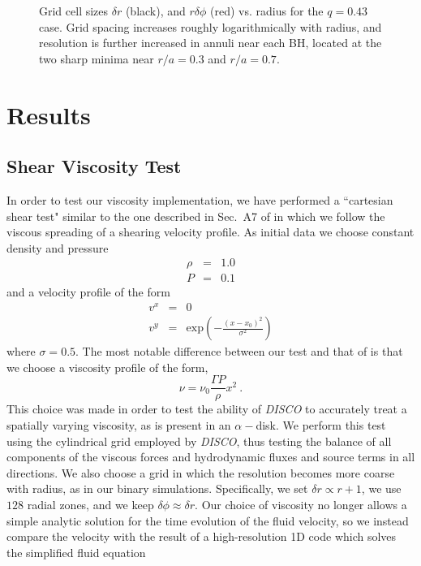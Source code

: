 \documentclass[apj]{emulateapj}
\begin{document}
\begin{figure}
\caption{Grid cell sizes $\delta r$ (black), and $r \delta \phi$ (red) vs. radius for the $q=0.43$ case. Grid spacing increases roughly logarithmically with radius, and resolution is further increased in annuli near each BH, located at the two sharp minima near $r/a=0.3$ and $r/a=0.7$. }
\label{fig:grid_info}
\end{figure}

\section{Results}
\label{sec:results}
    \subsection{Shear Viscosity Test}
    In order to test our viscosity implementation, we have performed a ``cartesian shear test" similar to the one described in Sec.~A7 of \citet{dorazio13} in which we follow the viscous spreading of a shearing velocity profile. As initial data we choose constant density and pressure
    \begin{eqnarray}
    \rho &=& 1.0\\
    P &=& 0.1
    \end{eqnarray}
    and a velocity profile of the form
    \begin{eqnarray}
    v^x &=& 0\\
          v^y &=& \mbox{exp}\left(-\frac{(x-x_0)^2}{\sigma^2}\right)
          \end{eqnarray}
          where $\sigma=0.5$. The most notable difference between our test and that of \citet{dorazio13} is that we choose a viscosity profile of the form,
          \begin{equation}
          \nu = \nu_0 \frac{\Gamma P}{\rho} x^{2} \ .
          \end{equation}
          This choice was made in order to test the ability of {\it DISCO} to accurately treat a spatially varying viscosity, as is present in an $\alpha-$disk. We perform this test using the cylindrical grid employed by {\it DISCO}, thus testing the balance of all components of the viscous forces and hydrodynamic fluxes and source terms in all directions. We also choose a grid in which the resolution becomes more coarse with radius, as in our binary simulations. Specifically, we set $\delta r \propto r+1$, we use $128$ radial zones, and we keep $\delta \phi \approx \delta r$. Our choice of viscosity no longer allows a simple analytic solution for the time evolution of the fluid velocity, so we instead compare the velocity with the result of a high-resolution 1D code which solves the simplified fluid equation
\end{document}
